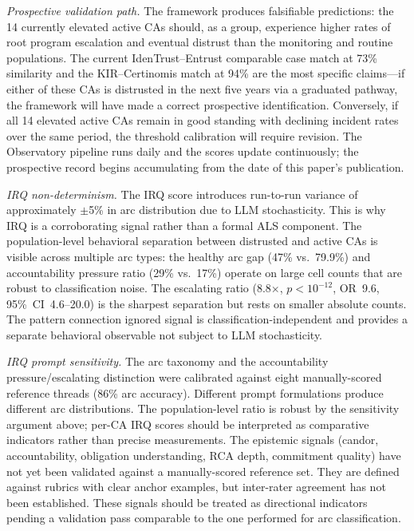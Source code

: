 \documentclass[10pt,twocolumn,letterpaper]{article}
\begin{document}
\textit{Prospective validation path.} The framework produces falsifiable predictions:
the 14 currently elevated active CAs should, as a group, experience higher rates of
root program escalation and eventual distrust than the monitoring and routine
populations. The current IdenTrust--Entrust comparable case match at 73\% similarity
and the KIR--Certinomis match at 94\% are the most specific claims---if either of
these CAs is distrusted in the next five years via a graduated pathway, the framework
will have made a correct prospective identification. Conversely, if all 14 elevated
active CAs remain in good standing with declining incident rates over the same period,
the threshold calibration will require revision. The Observatory pipeline runs daily
and the scores update continuously; the prospective record begins accumulating from
the date of this paper's publication.

\textit{IRQ non-determinism.} The IRQ score introduces run-to-run variance of
approximately $\pm$5\% in arc distribution due to LLM stochasticity. This is why IRQ
is a corroborating signal rather than a formal ALS component. The population-level
behavioral separation between distrusted and active CAs is visible across multiple
arc types: the healthy arc gap (47\% vs.\ 79.9\%) and accountability pressure ratio
(29\% vs.\ 17\%) operate on large cell counts that are robust to classification noise.
The escalating ratio (8.8$\times$, $p < 10^{-12}$, OR~9.6, 95\%~CI~4.6--20.0) is
the sharpest separation but rests on smaller absolute counts. The pattern connection
ignored signal is classification-independent and provides a separate behavioral
observable not subject to LLM stochasticity.

\textit{IRQ prompt sensitivity.} The arc taxonomy and the accountability pressure/escalating
distinction were calibrated against eight manually-scored reference threads (86\% arc
accuracy). Different prompt formulations produce different arc distributions. The
population-level ratio is robust by the sensitivity argument above; per-CA IRQ scores
should be interpreted as comparative indicators rather than precise measurements. The
epistemic signals (candor, accountability, obligation understanding, RCA depth, commitment
quality) have not yet been validated against a manually-scored reference set. They are
defined against rubrics with clear anchor examples, but inter-rater agreement has not been
established. These signals should be treated as directional indicators pending a
validation pass comparable to the one performed for arc classification.
\end{document}

